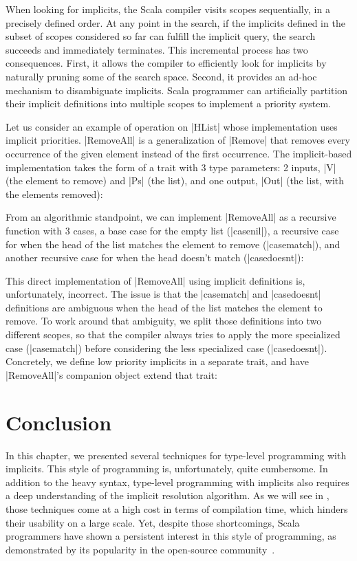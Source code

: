 When looking for implicits, the Scala compiler visits scopes sequentially, in a precisely defined order.
At any point in the search, if the implicits defined in the subset of scopes considered so far can fulfill the implicit query, the search succeeds and immediately terminates.
This incremental process has two consequences.
First, it allows the compiler to efficiently look for implicits by naturally pruning some of the search space.
Second, it provides an ad-hoc mechanism to disambiguate implicits.
Scala programmer can artificially partition their implicit definitions into multiple scopes to implement a priority system.

Let us consider an example of operation on |HList| whose implementation uses implicit priorities.
|RemoveAll| is a generalization of |Remove| that removes every occurrence of the given element instead of the first occurrence.
The implicit-based implementation takes the form of a trait with 3 type parameters: 2 inputs, |V| (the element to remove) and |Ps| (the list), and one output, |Out| (the list, with the elements removed):

\removeAllDefinition

From an algorithmic standpoint, we can implement |RemoveAll| as a recursive function with 3 cases, a base case for the empty list (|casenil|), a recursive case for when the head of the list matches the element to remove (|casematch|), and another recursive case for when the head doesn't match (|casedoesnt|):

\removeAllBroken

This direct implementation of |RemoveAll| using implicit definitions is, unfortunately, incorrect.
The issue is that the |casematch| and |casedoesnt| definitions are ambiguous when the head of the list matches the element to remove.
To work around that ambiguity, we split those definitions into two different scopes, so that the compiler always tries to apply the more specialized case (|casematch|) before considering the less specialized case (|casedoesnt|).
Concretely, we define low priority implicits in a separate trait, and have |RemoveAll|'s companion object extend that trait:

\removeAllPrioritized

\section{Conclusion}

In this chapter, we presented several techniques for type-level programming with implicits.
This style of programming is, unfortunately, quite cumbersome.
In addition to the heavy syntax, type-level programming with implicits also requires a deep understanding of the implicit resolution algorithm.
As we will see in , those techniques come at a high cost in terms of compilation time, which hinders their usability on a large scale.
Yet, despite those shortcomings, Scala programmers have shown a persistent interest in this style of programming, as demonstrated by its popularity in the open-source community~\citep{sabin2011shapeless, pilquist2013scodecs, blanvillain2016frameless}.

